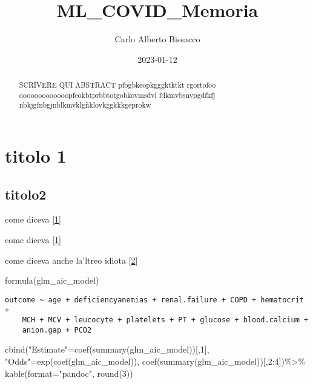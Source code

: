 \documentclass[
]{article}
\title{ML\_COVID\_Memoria}
\author{Carlo Alberto Bissacco}
\date{2023-01-12}
\newenvironment{Shaded}{\begin{snugshade}}{\end{snugshade}}
\newcommand{\AttributeTok}[1]{\textcolor[rgb]{0.77,0.63,0.00}{#1}}
\newcommand{\DecValTok}[1]{\textcolor[rgb]{0.00,0.00,0.81}{#1}}
\newcommand{\FunctionTok}[1]{\textcolor[rgb]{0.00,0.00,0.00}{#1}}
\newcommand{\NormalTok}[1]{#1}
\newcommand{\OtherTok}[1]{\textcolor[rgb]{0.56,0.35,0.01}{#1}}
\newcommand{\SpecialCharTok}[1]{\textcolor[rgb]{0.00,0.00,0.00}{#1}}
\newcommand{\StringTok}[1]{\textcolor[rgb]{0.31,0.60,0.02}{#1}}
\begin{document}
\maketitle
\begin{abstract}
SCRIVERE QUI ABSTRACT pfogbkeopkgggktktkt rgortofoo
ooooooooooooopfeokbtprbbtotgobkovmsdvl fdkmvbsnvpgdfkfj
nbkjgfnbgjnblkmvklgñklovkggkkkgeprokw
\end{abstract}

{
\hypersetup{linkcolor=}
\setcounter{tocdepth}{2}
\tableofcontents
}
\pagebreak

\pagebreak

\hypertarget{titolo-1}{%
\section{titolo 1}\label{titolo-1}}

\hypertarget{titolo2}{%
\subsection{titolo2}\label{titolo2}}

come diceva {[}\protect\hyperlink{ref-obermeyer2016predicting}{1}{]}

come diceva {[}\protect\hyperlink{ref-obermeyer2016predicting}{1}{]}

come diceva anche la'ltreo idiota
{[}\protect\hyperlink{ref-couronne2018random}{2}{]}

\begin{Shaded}
\begin{Highlighting}[]
\FunctionTok{formula}\NormalTok{(glm\_aic\_model)}
\end{Highlighting}
\end{Shaded}

\begin{verbatim}
outcome ~ age + deficiencyanemias + renal.failure + COPD + hematocrit + 
    MCH + MCV + leucocyte + platelets + PT + glucose + blood.calcium + 
    anion.gap + PCO2
\end{verbatim}

\begin{Shaded}
\begin{Highlighting}[]
\FunctionTok{cbind}\NormalTok{(}\StringTok{"Estimate"}\OtherTok{=}\FunctionTok{coef}\NormalTok{(}\FunctionTok{summary}\NormalTok{(glm\_aic\_model))[,}\DecValTok{1}\NormalTok{], }\StringTok{"Odds"}\OtherTok{=}\FunctionTok{exp}\NormalTok{(}\FunctionTok{coef}\NormalTok{(glm\_aic\_model)), }\FunctionTok{coef}\NormalTok{(}\FunctionTok{summary}\NormalTok{(glm\_aic\_model))[,}\DecValTok{2}\SpecialCharTok{:}\DecValTok{4}\NormalTok{])}\SpecialCharTok{\%\textgreater{}\%}
  \FunctionTok{kable}\NormalTok{(}\AttributeTok{format=}\StringTok{"pandoc"}\NormalTok{, }\FunctionTok{round}\NormalTok{(}\DecValTok{3}\NormalTok{))}
\end{Highlighting}
\end{Shaded}
\end{document}
